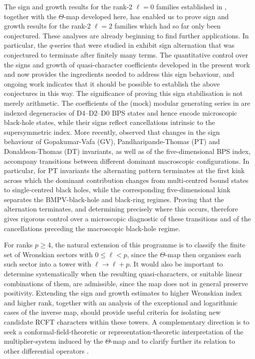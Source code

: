 \documentclass[11pt]{article}
\begin{document}
The sign and growth results for the rank-2 $\ell=0$ families established in \cite{Das:2025gto}, together with the $\Theta$-map developed here, has enabled us to prove sign and growth results for the rank-2 $\ell=2$ families which had so far only been conjectured. 
These analyses are already beginning to find further applications. In particular, the $q$-series that were studied in \cite{Alexandrov:2023ltz, Alexandrov:2023zjb} exhibit sign alternation that was conjectured to terminate after finitely many terms. The quantitative control over the signs and growth of quasi-character coefficients developed in the present work and \cite{Das:2025gto} now provides the ingredients needed to address this sign behaviour, and ongoing work \cite{DasMukhi:unpub} indicates that it should be possible to establish the above conjectures in this way. The significance of proving this sign stabilisation is not merely arithmetic. The coefficients of the (mock) modular generating series in \cite{Alexandrov:2023ltz,Alexandrov:2023zjb} are indexed degeneracies of D4--D2--D0 BPS states and hence encode microscopic black-hole states, while their signs reflect cancellations intrinsic to the supersymmetric index. More recently, \cite{Alexandrov:2026rra} observed that changes in the sign behaviour of Gopakumar-Vafa (GV), Pandharipande-Thomas (PT) and Donaldson-Thomas (DT) invariants, as well as of the five-dimensional BPS index, accompany transitions between different dominant macroscopic configurations. In particular, for PT invariants the alternating pattern terminates at the first kink across which the dominant contribution changes from multi-centred bound states to single-centred black holes, while the corresponding five-dimensional kink separates the BMPV-black-hole \cite{Breckenridge:1996is} and black-ring regimes. Proving that the alternation terminates, and determining precisely where this occurs, therefore gives rigorous control over a microscopic diagnostic of these transitions and of the cancellations preceding the macroscopic black-hole regime.

For ranks $p\geq4$, the natural extension of this programme is to classify the finite set of Wronskian sectors with $0\leq\ell<p$, since the $\Theta$-map then organises each such sector into a tower with $\ell\to\ell+p$. It would also be important to determine systematically when the resulting quasi-characters, or suitable linear combinations of them, are admissible, since the map does not in general preserve positivity. Extending the sign and growth estimates to higher Wronskian index and higher rank, together with an analysis of the exceptional and logarithmic cases of the inverse map, should provide useful criteria for isolating new candidate RCFT characters within these towers. A complementary direction is to seek a conformal-field-theoretic or representation-theoretic interpretation of the multiplier-system induced by the $\Theta$-map and to clarify further its relation to other differential operators \cite{Bantay:2007zz, Govindarajan:2025jlq, nagatomo2022MLDE}.
\end{document}
